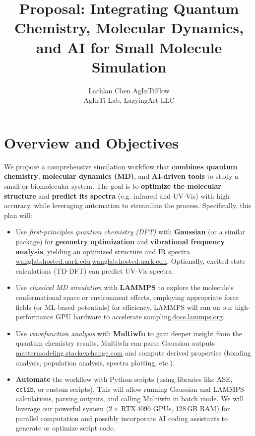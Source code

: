 \documentclass[11pt]{article}
\title{Proposal: Integrating Quantum Chemistry, Molecular Dynamics, and AI for Small Molecule Simulation}
\author{\begin{tabular}{c}Lachlan Chen \quad AgInTiFlow\\AgInTi Lab, LazyingArt LLC\end{tabular}}
\date{}
\begin{document}
\maketitle

\section{Overview and Objectives}
We propose a comprehensive simulation workflow that \textbf{combines quantum chemistry}, \textbf{molecular dynamics (MD)}, and \textbf{AI-driven tools} to study a small or biomolecular system. The goal is to \textbf{optimize the molecular structure} and \textbf{predict its spectra} (e.g. infrared and UV-Vis) with high accuracy, while leveraging automation to streamline the process. Specifically, this plan will:

\begin{itemize}
  \item Use \emph{first-principles quantum chemistry (DFT)} with \textbf{Gaussian} (or a similar package) for \textbf{geometry optimization} and \textbf{vibrational frequency analysis}, yielding an optimized structure and IR spectra\,\href{https://wanglab.hosted.uark.edu/g98help/00000437.htm\#:\~:text=frequencies\%20for\%20a\%20correlated\%20method,route\%20section\%20for\%20a\%20job}{wanglab.hosted.uark.edu}\,\href{https://wanglab.hosted.uark.edu/g98help/00000437.htm\#:\~:text=This\%20calculation\%20type\%20keyword\%20computes,required\%2C\%20polarizabilities\%20must\%20be\%20explicitly}{wanglab.hosted.uark.edu}. Optionally, excited-state calculations (TD-DFT) can predict UV-Vis spectra.
  \item Use \emph{classical MD simulation} with \textbf{LAMMPS} to explore the molecule’s conformational space or environment effects, employing appropriate force fields (or ML-based potentials) for efficiency. LAMMPS will run on our high-performance GPU hardware to accelerate sampling\,\href{https://docs.lammps.org/Intro_overview.html\#:\~:text=clusters\%20and\%20supercomputers,threading\%2C\%20vectorization\%2C\%20and\%20GPU\%20acceleration}{docs.lammps.org}.
  \item Use \emph{wavefunction analysis} with \textbf{Multiwfn} to gain deeper insight from the quantum chemistry results. Multiwfn can parse Gaussian outputs\,\href{https://mattermodeling.stackexchange.com/questions/3493/quantifying-electronic-overlap\#:\~:text=,MRCC\%2C\%20deMon2k\%2C\%20Firefly\%2C\%20CFour\%2C\%20Turbomole}{mattermodeling.stackexchange.com} and compute derived properties (bonding analysis, population analysis, spectra plotting, etc.).
  \item \textbf{Automate} the workflow with Python scripts (using libraries like ASE, \texttt{cclib}, or custom scripts). This will allow running Gaussian and LAMMPS calculations, parsing outputs, and calling Multiwfn in batch mode. We will leverage our powerful system (2\,$\times$ RTX\,4090 GPUs, 128\,GB RAM) for parallel computation and possibly incorporate AI coding assistants to generate or optimize script code.
\end{itemize}
\end{document}
